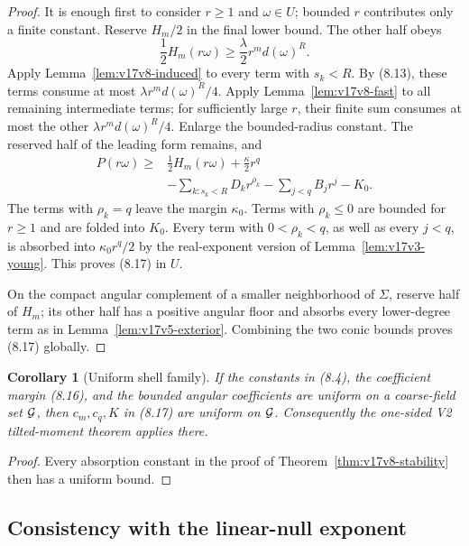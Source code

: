 \documentclass[11pt]{article}
\newtheorem{corollary}[theorem]{Corollary}
\theoremstyle{remark}
\begin{document}
\begin{proof}
It is enough first to consider \(r\geq1\) and \(\omega\in U\);
bounded \(r\) contributes only a finite constant.  Reserve
\(H_m/2\) in the final lower bound.  The other half obeys
\[
 \frac12H_m(r\omega)
 \geq\frac{\lambda}{2}r^md(\omega)^R.
\]
Apply Lemma~\ref{lem:v17v8-induced} to every term with \(s_k<R\).
By (8.13), these terms consume at most
\(\lambda r^md(\omega)^R/4\).  Apply
Lemma~\ref{lem:v17v8-fast} to all remaining intermediate terms;
for sufficiently large \(r\), their finite sum consumes at most the
other \(\lambda r^md(\omega)^R/4\).  Enlarge the bounded-radius
constant.  The reserved half of the leading form remains, and
\[
\begin{split}
 P(r\omega)\geq&
 \frac12H_m(r\omega)+\frac{\kappa}{2}r^q\\
 &-\sum_{k:s_k<R}D_kr^{\rho_k}
 -\sum_{j<q}B_jr^j-K_0.                            \tag{8.18}
\end{split}
\]
The terms with \(\rho_k=q\) leave the margin \(\kappa_0\).
Terms with \(\rho_k\leq0\) are bounded for \(r\geq1\) and are
folded into \(K_0\).  Every term with \(0<\rho_k<q\), as well as
every \(j<q\), is absorbed into \(\kappa_0r^q/2\) by the
real-exponent version of Lemma~\ref{lem:v17v3-young}.  This proves
(8.17) in \(U\).

On the compact angular complement of a smaller neighborhood of
\(\Sigma\), reserve half of \(H_m\); its other half has a positive
angular floor and absorbs every lower-degree term as in
Lemma~\ref{lem:v17v5-exterior}.  Combining the two conic bounds
proves (8.17) globally.
\end{proof}

\begin{corollary}[Uniform shell family]
\label{cor:v17v8-family}
If the constants in (8.4), the coefficient margin (8.16), and the
bounded angular coefficients are uniform on a coarse-field set
\({\cal G}\), then \(c_m,c_q,K\) in (8.17) are uniform on
\({\cal G}\).  Consequently the one-sided V2 tilted-moment theorem
applies there.
\end{corollary}

\begin{proof}
Every absorption constant in the proof of
Theorem~\ref{thm:v17v8-stability} then has a uniform bound.
\end{proof}

\subsection{Consistency with the linear-null exponent}
\end{document}
